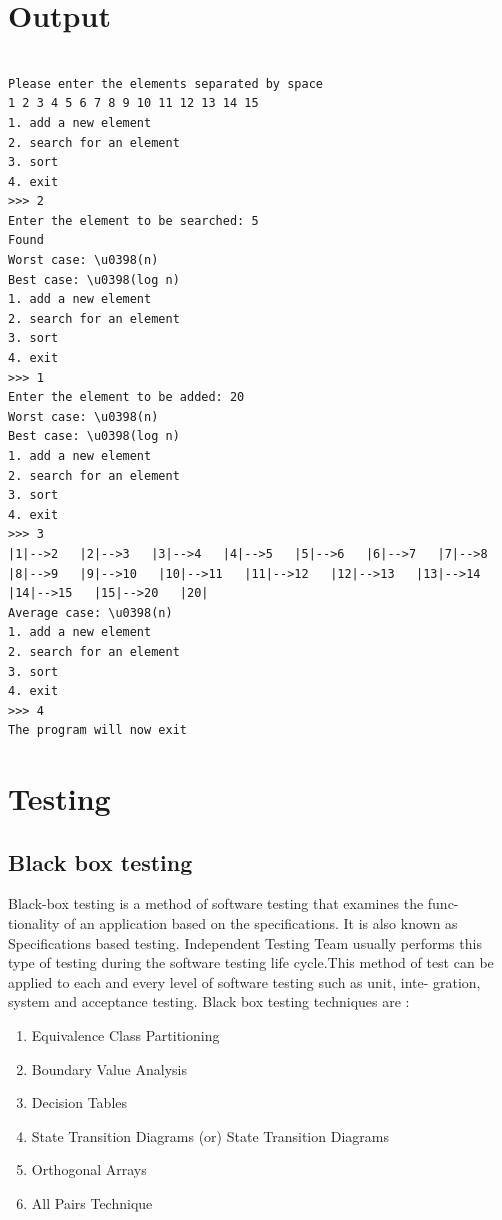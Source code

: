\documentclass[10pt,a4paper]{article}
\begin{document}
\section{Output}
\begin{lstlisting}

Please enter the elements separated by space
1 2 3 4 5 6 7 8 9 10 11 12 13 14 15 
1. add a new element
2. search for an element
3. sort
4. exit
>>> 2
Enter the element to be searched: 5
Found
Worst case: \u0398(n)
Best case: \u0398(log n)
1. add a new element
2. search for an element
3. sort
4. exit
>>> 1
Enter the element to be added: 20
Worst case: \u0398(n)
Best case: \u0398(log n)
1. add a new element
2. search for an element
3. sort
4. exit
>>> 3
|1|-->2   |2|-->3   |3|-->4   |4|-->5   |5|-->6   |6|-->7   |7|-->8   |8|-->9   |9|-->10   |10|-->11   |11|-->12   |12|-->13   |13|-->14   |14|-->15   |15|-->20   |20|   
Average case: \u0398(n)
1. add a new element
2. search for an element
3. sort
4. exit
>>> 4
The program will now exit

\end{lstlisting}

\section{Testing}
\subsection{Black box testing}
Black-box testing is a method of software testing that examines the func-
tionality of an application based on the specifications. It is also known as
Specifications based testing. Independent Testing Team usually performs
this type of testing during the software testing life cycle.This method of test
can be applied to each and every level of software testing such as unit, inte-
gration, system and acceptance testing.
Black box testing techniques are :

\begin{enumerate}
	\item Equivalence Class Partitioning
	\item Boundary Value Analysis
	\item Decision Tables
	\item State Transition Diagrams (or) State	Transition Diagrams
	\item Orthogonal Arrays
	\item All Pairs Technique
\end{enumerate}
\end{document}
